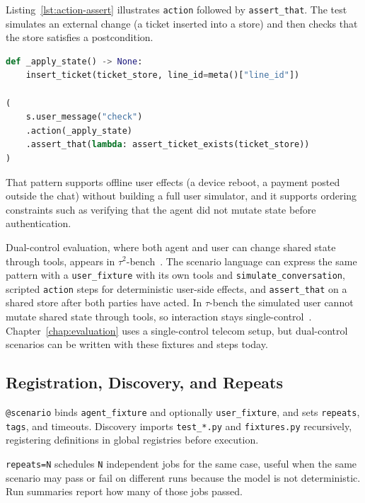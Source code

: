 Listing~\ref{lst:action-assert} illustrates \texttt{action} followed by \texttt{assert\_that}. The test simulates an external change (a ticket inserted into a store) and then checks that the store satisfies a postcondition.

\begin{lstlisting}[language=Python,caption={Mid-scenario environment mutation and state check.},label=lst:action-assert]
def _apply_state() -> None:
    insert_ticket(ticket_store, line_id=meta()["line_id"])

(
    s.user_message("check")
    .action(_apply_state)
    .assert_that(lambda: assert_ticket_exists(ticket_store))
)
\end{lstlisting}

That pattern supports offline user effects (a device reboot, a payment posted outside the chat) without building a full user simulator, and it supports ordering constraints such as verifying that the agent did not mutate state before authentication.

Dual-control evaluation, where both agent and user can change shared state through tools, appears in $\tau^2$-bench~\citep{barres2025tau2}. The scenario language can express the same pattern with a \texttt{user\_fixture} with its own tools and \texttt{simulate\_conversation}, scripted \texttt{action} steps for deterministic user-side effects, and \texttt{assert\_that} on a shared store after both parties have acted. In $\tau$-bench the simulated user cannot mutate shared state through tools, so interaction stays single-control~\citep{yao2024taubench}. Chapter~\ref{chap:evaluation} uses a single-control telecom setup, but dual-control scenarios can be written with these fixtures and steps today.

\subsection{Registration, Discovery, and Repeats}

\texttt{@scenario} binds \texttt{agent\_fixture} and optionally \texttt{user\_fixture}, and sets \texttt{repeats}, \texttt{tags}, and timeouts. Discovery imports \texttt{test\_*.py} and \texttt{fixtures.py} recursively, registering definitions in global registries before execution.

\texttt{repeats=N} schedules \texttt{N} independent jobs for the same case, useful when the same scenario may pass or fail on different runs because the model is not deterministic. Run summaries report how many of those jobs passed.

